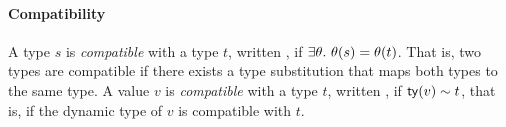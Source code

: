 

\paragraph{Compatibility}
%
A type $s$ is \emph{compatible} with a type $t$, written ,
if $\exists \theta.\ \theta(s) = \theta(t)$.
%
That is, two types are compatible if there exists a type substitution
that maps both types to the same type.
%
A value $v$ is \emph{compatible} with a type $t$, written ,
if $\mathsf{ty}(v) \sim t$, that is, if the dynamic type of $v$ is
compatible with $t$.



